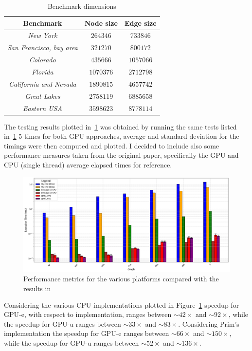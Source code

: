 \documentclass[a4paper,10pt]{article}
\begin{document}
\begin{longtable}{|c|c|c|}
	\caption{Benchmark dimensions}\label{tbl:benchmarks}
	\\\hline\textbf{Benchmark} & \textbf{Node size} & \textbf{Edge size} \\\hline\hline
	\endfirsthead\hline\endlastfoot

	\textit{New York}                & $\num{264346}$   & $\num{733846}$  \\\hline
	\textit{San Francisco, bay area} & $\num{321270}$   & $\num{800172}$  \\\hline
	\textit{Colorado}                & $\num{435666}$   & $\num{1057066}$ \\\hline
	\textit{Florida}                 & $\num{1070376}$  & $\num{2712798}$ \\\hline
	\textit{California and Nevada}   & $\num{1890815}$ & $\num{4657742}$ \\\hline
	\textit{Great Lakes}             & $\num{2758119}$  & $\num{6885658}$ \\\hline
	\textit{Eastern USA}             & $\num{3598623}$  & $\num{8778114}$
\end{longtable}
The testing results plotted in~\ref{fig:results} was obtained by running the same tests listed in~\ref{tbl:benchmarks} $5$ times for both GPU approaches, average and standard deviation for the timings were then computed and plotted. I decided to include also some performance measures taken from the original paper, specifically the GPU and CPU (single thread) average elapsed times for reference.
\begin{figure}
	\centering
	\includegraphics[scale=0.4]{fig/benchmarks.png}
	\caption{Performance metrics for the various platforms compared with the results in \cite{generic-he-boruvka}}
	\label{fig:results}
\end{figure}
Considering the various CPU implementations plotted in Figure~\ref{fig:results} speedup for GPU-e, with respect to \brka implementation, ranges between $\sim42\times$ and $\sim92\times$, while the speedup for GPU-u ranges between $\sim33\times$ and $\sim83\times$. Considering Prim's implementation the speedup for GPU-e ranges between $\sim66\times$ and $\sim150\times$, while the speedup for GPU-u ranges between $\sim52\times$ and $\sim136\times$.
\end{document}
